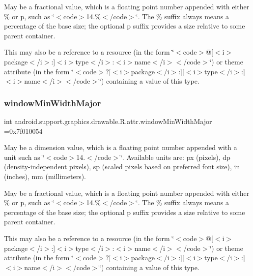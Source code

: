 May be a fractional value, which is a floating point number appended with either \% or p, such as \char`\"{}$<$code$>$14.\%$<$/code$>$\char`\"{}. The \% suffix always means a percentage of the base size; the optional p suffix provides a size relative to some parent container. 

This may also be a reference to a resource (in the form \char`\"{}$<$code$>$@\mbox{[}$<$i$>$package$<$/i$>$\+:\mbox{]}$<$i$>$type$<$/i$>$\+:$<$i$>$name$<$/i$>$$<$/code$>$\char`\"{}) or theme attribute (in the form \char`\"{}$<$code$>$?\mbox{[}$<$i$>$package$<$/i$>$\+:\mbox{]}\mbox{[}$<$i$>$type$<$/i$>$\+:\mbox{]}$<$i$>$name$<$/i$>$$<$/code$>$\char`\"{}) containing a value of this type. \mbox{\label{classandroid_1_1support_1_1graphics_1_1drawable_1_1R_1_1attr_a2db07978ce02ea75d5b6aa991bda535a}} 
\subsubsection{\texorpdfstring{window\+Min\+Width\+Major}{windowMinWidthMajor}}
{\footnotesize\ttfamily int android.\+support.\+graphics.\+drawable.\+R.\+attr.\+window\+Min\+Width\+Major =0x7f010054\hspace{0.3cm}{\ttfamily [static]}}

May be a dimension value, which is a floating point number appended with a unit such as \char`\"{}$<$code$>$14.\+5sp$<$/code$>$\char`\"{}. Available units are\+: px (pixels), dp (density-\/independent pixels), sp (scaled pixels based on preferred font size), in (inches), mm (millimeters). 

May be a fractional value, which is a floating point number appended with either \% or p, such as \char`\"{}$<$code$>$14.\%$<$/code$>$\char`\"{}. The \% suffix always means a percentage of the base size; the optional p suffix provides a size relative to some parent container. 

This may also be a reference to a resource (in the form \char`\"{}$<$code$>$@\mbox{[}$<$i$>$package$<$/i$>$\+:\mbox{]}$<$i$>$type$<$/i$>$\+:$<$i$>$name$<$/i$>$$<$/code$>$\char`\"{}) or theme attribute (in the form \char`\"{}$<$code$>$?\mbox{[}$<$i$>$package$<$/i$>$\+:\mbox{]}\mbox{[}$<$i$>$type$<$/i$>$\+:\mbox{]}$<$i$>$name$<$/i$>$$<$/code$>$\char`\"{}) containing a value of this type. \mbox{\label{classandroid_1_1support_1_1graphics_1_1drawable_1_1R_1_1attr_aa8df480df675f492a266a42fc0dbdfc6}} 
